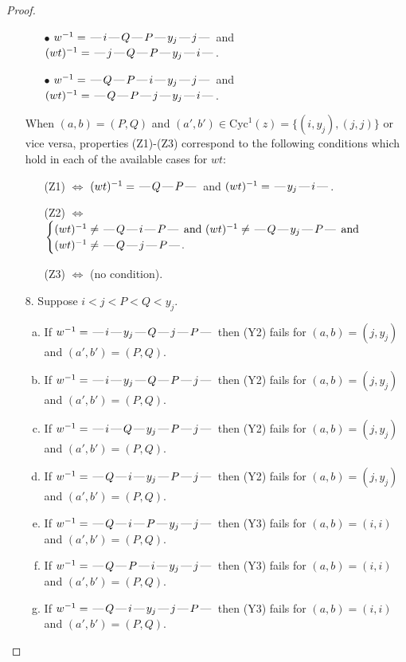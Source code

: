 \documentclass[10pt]{article}
\theoremstyle{definition}
\theoremstyle{definition}
\def\dash{\text{\hspace{0.5mm}---\hspace{0.5mm}}}
\def\Cyc{\mathrm{Cyc}}
\begin{document}
\begin{proof}
\begin{enumerate}
\begin{enumerate}
\item[$\bullet$] $w^{-1} = \dash i\dash Q\dash P\dash y_j\dash j\dash $ and $(wt)^{-1} = \dash j\dash Q\dash P\dash y_j\dash i\dash $.
\item[$\bullet$] $w^{-1} = \dash Q\dash P\dash i\dash y_j\dash j\dash $ and $(wt)^{-1} = \dash Q\dash P\dash j\dash y_j\dash i\dash $.
\end{enumerate}
When $(a,b)= (P,Q)$ and $(a',b')\in \Cyc^1(z)=\{(i,y_j),(j,j)\}$ or vice versa,
properties (Z1)-(Z3) correspond to the following conditions which
hold in each of the available cases for $wt$:
\begin{enumerate}
\item[](Z1) $\Leftrightarrow$ $(wt)^{-1} = \dash Q \dash P \dash$  and $(wt)^{-1} = \dash y_j \dash i \dash$.
\item[](Z2) $\Leftrightarrow$ $\begin{cases}\text{$(wt)^{-1} \neq \dash Q \dash i \dash P \dash$ and $(wt)^{-1}\neq \dash Q \dash y_j \dash P \dash$}\text{ and }\\
\text{$(wt)^{-1} \neq \dash Q \dash j \dash P \dash$}.\end{cases}$
\item[](Z3) $\Leftrightarrow$ (no condition).
\end{enumerate}
\item[$8$.] Suppose $i < j < P < Q < y_j$.
\begin{enumerate}[(a)]
\item If $w^{-1} = \dash i\dash y_j\dash Q\dash j\dash P\dash $ then (Y2) fails for $(a,b)=(j,y_j)$ and $(a',b')=(P,Q)$.
\item If $w^{-1} = \dash i\dash y_j\dash Q\dash P\dash j\dash $ then (Y2) fails for $(a,b)=(j,y_j)$ and $(a',b')=(P,Q)$.
\item If $w^{-1} = \dash i\dash Q\dash y_j\dash P\dash j\dash $ then (Y2) fails for $(a,b)=(j,y_j)$ and $(a',b')=(P,Q)$.
\item If $w^{-1} = \dash Q\dash i\dash y_j\dash P\dash j\dash $ then (Y2) fails for $(a,b)=(j,y_j)$ and $(a',b')=(P,Q)$.
\item If $w^{-1} = \dash Q\dash i\dash P\dash y_j\dash j\dash $ then (Y3) fails for $(a,b)=(i,i)$ and $(a',b')=(P,Q)$.
\item If $w^{-1} = \dash Q\dash P\dash i\dash y_j\dash j\dash $ then (Y3) fails for $(a,b)=(i,i)$ and $(a',b')=(P,Q)$.
\item If $w^{-1} = \dash Q\dash i\dash y_j\dash j\dash P\dash $ then (Y3) fails for $(a,b)=(i,i)$ and $(a',b')=(P,Q)$.

\end{enumerate}
\end{enumerate}
\end{proof}
\end{document}
